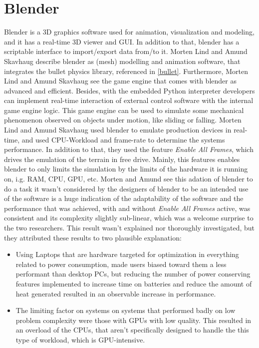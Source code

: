 \documentclass[
	12pt, 
	a4paper, 
]{article}
\begin{document}
	\section{Blender}\label{blender}
	Blender is a 3D graphics software used for animation, visualization and modeling, and it has a real-time 3D viewer and GUI. In addition to that, blender has a scriptable interface to import/export data from/to it\cite{kent20153d}. Morten Lind and Amund Skavhaug describe blender as (mesh) modelling and animation software, that integrates the bullet physics library, referenced in \ref{bullet}. Furthermore, Morten Lind and Amund Skavhaug see the game engine that comes with blender as advanced and efficient. Besides, with the embedded Python interpreter developers can implement real-time interaction of external control software with the internal game engine logic. This game engine can be used to simulate some mechanical phenomenon observed on objects under motion, like sliding or falling.\cite{lind2012using}\newline
	Morten Lind and Amund Skavhaug used blender to emulate production devices in real-time, and used CPU-Workload and frame-rate to determine the systems performance. In addition to that, they used the feature \textit{Enable All Frames}, which drives the emulation of the terrain in free drive. Mainly, this features enables blender to only limits the simulation by the limits of the hardware it is running on, i.g. RAM, CPU, GPU, etc\cite{lind2012using}. Morten and Amund see this adation of blender to do a task it wasn't considered by the designers of blender to be an intended use of the software\cite{lind2012using} is a huge indication of the adaptability of the software and the performance that was achieved, with and without \textit{Enable All Frames} active, was consistent and its complexity slightly sub-linear\cite{lind2012using}, which was a welcome surprise to the two researchers. This result wasn't explained nor thoroughly investigated, but they attributed these results to two plausible explanation\cite{lind2012using}:
	\begin{itemize}
		\item Using Laptops that are hardware targeted for optimization in everything related to power consumption, made users biased toward them a less performant than desktop PCs, but reducing the number of power conserving features implemented to increase time on batteries and reduce the amount of heat generated resulted in an observable increase in performance\cite{lind2012using}.
		\item The limiting factor on systems on systems that performed badly on low problem complexity were those with GPUs with low quality. This resulted in an overload of the CPUs, that aren't specifically designed to handle the this type of workload, which is GPU-intensive\cite{lind2012using}.
	\end{itemize}
\end{document}
